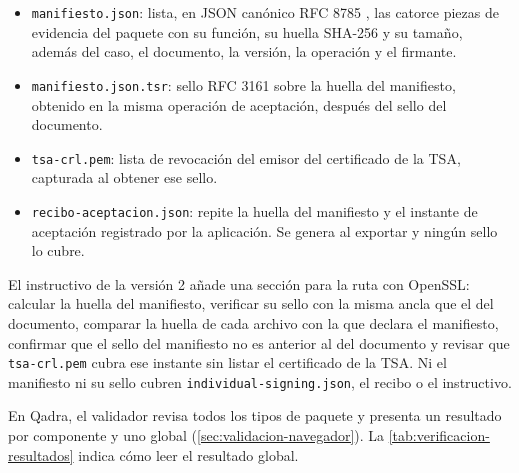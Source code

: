 \begin{itemize}
  \item \texttt{manifiesto.json}: lista, en JSON canónico RFC 8785 \cite{rundgren2020}, las catorce piezas de evidencia del paquete con su función, su huella SHA-256 y su tamaño, además del caso, el documento, la versión, la operación y el firmante.
  \item \texttt{manifiesto.json.tsr}: sello RFC 3161 sobre la huella del manifiesto, obtenido en la misma operación de aceptación, después del sello del documento.
  \item \texttt{tsa-crl.pem}: lista de revocación del emisor del certificado de la TSA, capturada al obtener ese sello.
  \item \texttt{recibo-aceptacion.json}: repite la huella del manifiesto y el instante de aceptación registrado por la aplicación. Se genera al exportar y ningún sello lo cubre.
\end{itemize}

El instructivo de la versión 2 añade una sección para la ruta con OpenSSL: calcular la huella del manifiesto, verificar su sello con la misma ancla que el del documento, comparar la huella de cada archivo con la que declara el manifiesto, confirmar que el sello del manifiesto no es anterior al del documento y revisar que \texttt{tsa-crl.pem} cubra ese instante sin listar el certificado de la TSA. Ni el manifiesto ni su sello cubren \texttt{individual-signing.json}, el recibo o el instructivo.

En Qadra, el validador revisa todos los tipos de paquete y presenta un resultado por componente y uno global (\cref{sec:validacion-navegador}). La \cref{tab:verificacion-resultados} indica cómo leer el resultado global.

